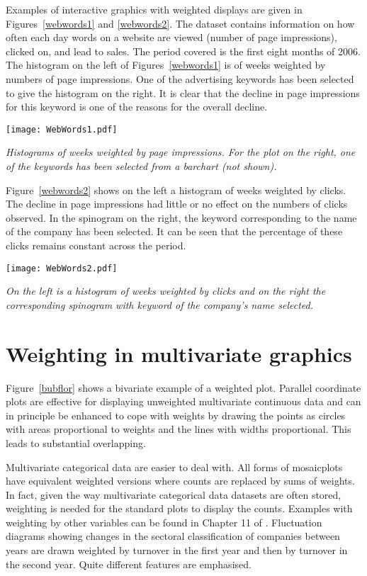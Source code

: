 \documentclass{svmult}
\begin{document}
Examples of interactive graphics with weighted displays are given in Figures~\ref{webwords1} and \ref{webwords2}.  The dataset contains information on how often each day words on a website are viewed (number of page impressions), clicked on, and lead to sales.  The period covered is the first eight months of 2006.  The histogram on the left of Figures~\ref{webwords1} is of weeks weighted by numbers of page impressions.  One of the advertising keywords has been selected to give the histogram on the right.  It is clear that the decline in page impressions for this keyword is one of the reasons for the overall decline.

\begin{center}
      \texttt{[image: WebWords1.pdf]}
      \caption{\label{webwords1}\em Histograms of weeks weighted by page impressions.  For the plot on the right, one of the keywords has been selected from a barchart (not shown).}
      \end{center}

Figure~\ref{webwords2} shows on the left a histogram of weeks weighted by clicks.  The decline in page impressions had little or no effect on the numbers of clicks observed.  In the spinogram on the right, the keyword corresponding to the name of the company has been selected.  It can be seen that the percentage of these clicks remains constant across the period.

\begin{center}
      \texttt{[image: WebWords2.pdf]}
      \caption{\label{webwords2}\em On the left is a histogram of weeks weighted by clicks and on the right the corresponding spinogram with keyword of the company's name selected.}
      \end{center}


\section{Weighting in multivariate graphics}
\label{mv}
Figure~\ref{bubflor} shows a bivariate example of a weighted plot.  Parallel coordinate plots are effective for displaying unweighted multivariate continuous data and can in principle be enhanced to cope with weights by drawing the points as circles with areas proportional to weights and the lines with widths proportional.  This leads to substantial overlapping.

Multivariate categorical data are easier to deal with.  All forms of mosaicplots have equivalent weighted versions where counts are replaced by sums of weights.  In fact, given the way multivariate categorical data datasets are often stored, weighting is needed for the standard plots to display the counts.  Examples with weighting by other variables can be found in Chapter 11 of \cite{unwin:2006}.  Fluctuation diagrams showing changes in the sectoral classification of companies between years are drawn weighted by turnover in the first year and then by turnover in the second year.  Quite different features are emphasised.
\end{document}
